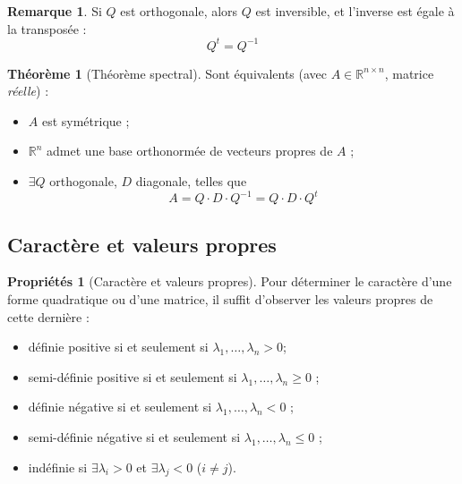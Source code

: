 \documentclass[11pt,a4paper]{article}
\theoremstyle{definition}
\newtheorem{myprop}[mydef]{Propriétés}
\newtheorem{myrem}[mydef]{Remarque}
\newtheorem{mytheo}[mydef]{Théorème}
\newcommand{\R}{\mathbb{R}}
\begin{document}
\begin{myrem}
Si $Q$ est orthogonale, alors $Q$ est inversible, et l'inverse est égale à la transposée :
\[ Q^t = Q^{-1} \]
\end{myrem}

\begin{mytheo}[Théorème spectral]
Sont équivalents (avec $A \in \R^{n \times n}$, matrice \emph{réelle}) :
\begin{itemize}
\item $A$ est symétrique ;
\item $\R^n$ admet une base orthonormée de vecteurs propres de $A$ ;
\item $\exists Q$ orthogonale, $D$ diagonale, telles que
\[ A = Q \cdot D \cdot Q^{-1} = Q \cdot D \cdot Q^t \]
\end{itemize}
\end{mytheo}

\subsection{Caractère et valeurs propres}

\begin{myprop}[Caractère et valeurs propres]
Pour déterminer le caractère d'une forme quadratique ou d'une matrice, il suffit d'observer les valeurs propres de cette dernière :
\begin{itemize}
\item définie positive si et seulement si $\lambda_1, \dots, \lambda_n > 0$;
\item semi-définie positive si et seulement si $\lambda_1, \dots, \lambda_n \geq 0$ ;
\item définie négative si et seulement si $\lambda_1, \dots, \lambda_n < 0$ ;
\item semi-définie négative si et seulement si $\lambda_1, \dots, \lambda_n \leq 0$ ;
\item indéfinie si $\exists  \lambda_i > 0$ et $\exists \lambda_j < 0$ ($i \neq j$).
\end{itemize}
\end{myprop}



\end{document}
